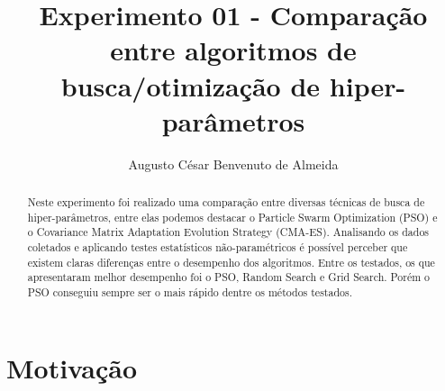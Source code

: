 \documentclass[preprint,12pt]{elsarticle}
\begin{document}
\begin{frontmatter}



\title{Experimento 01 - Comparação entre algoritmos de busca/otimização de hiper-parâmetros}


\author{Augusto César Benvenuto de Almeida}

\begin{abstract}

Neste experimento foi realizado uma comparação entre diversas técnicas de busca de hiper-parâmetros, entre elas podemos destacar o Particle Swarm Optimization (PSO) e o Covariance Matrix Adaptation Evolution Strategy (CMA-ES). Analisando os dados coletados e aplicando testes estatísticos não-paramétricos é possível perceber que existem claras diferenças entre o desempenho dos algoritmos. Entre os testados, os que apresentaram melhor desempenho foi o PSO, Random Search e Grid Search. Porém o PSO conseguiu sempre ser o mais rápido dentre os métodos testados.

\end{abstract}


\end{frontmatter}


\section{Motivação}
\label{S:1}
\end{document}
